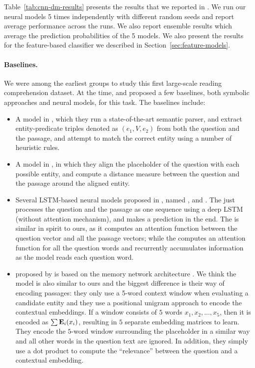 Table~\ref{tab:cnn-dm-results} presents the results that we reported in . We run our neural models 5 times independently with different random seeds and report average performance across the runs. We also report ensemble results which average the prediction probabilities of the 5 models. We also present the results for the feature-based classifier we described in Section~\ref{sec:feature-models}.

\paragraph{Baselines.} We were among the earliest groups to study this first large-scale reading comprehension dataset. At the time,  and  proposed a few baselines, both symbolic approaches and neural models, for this task. The baselines include:
\begin{itemize}
    \item
        A  model in , which they run a state-of-the-art semantic parser, and extract entity-predicate triples denoted as $(e_1, V, e_2)$ from both the question and the passage, and attempt to match the correct entity using a number of heuristic rules.
    \item
        A  model in , in which they align the placeholder of the question with each possible entity, and compute a distance measure between the question and the passage around the aligned entity.
    \item
        Several LSTM-based neural models proposed in , named ,  and . The  just processes the question and the passage as one sequence using a deep LSTM (without attention mechanism), and makes a prediction in the end. The  is similar in spirit to ours, as it computes an attention function between the question vector and all the passage vectors; while the  computes an attention function for all the question words and recurrently accumulates information as the model reads each question word.
    \item
         proposed by  is based on the memory network architecture \cite{weston2015memory}. We think the model is also similar to ours and the biggest difference is their way of encoding passages: they only use a 5-word context window when evaluating a candidate entity and they use a positional unigram approach to encode the contextual embeddings. If a window consists of $5$ words $x_1, x_2, \ldots, x_5$, then it is encoded as $\sum{\mathbf{E}_i(x_i)}$, resulting in $5$ separate embedding matrices to learn. They encode the $5$-word window surrounding the placeholder in a similar way and all other words in the question text are ignored. In addition, they simply use a dot product to compute the ``relevance'' between the question and a contextual embedding.
\end{itemize}

